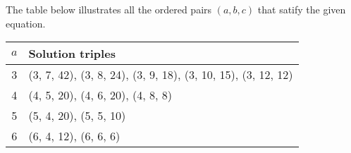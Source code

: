\begin{solution}
    The table below illustrates all the ordered pairs $(a, b, c)$ that satify
    the given equation. \qedhere
    \begin{center}
        \begin{tabular}{ |c|l| }
            \hline
            $a$ & Solution triples\\
            \hline
            3 & (3, 7, 42), (3, 8, 24), (3, 9, 18), (3, 10, 15), (3, 12, 12)\\
            4 & (4, 5, 20), (4, 6, 20), (4, 8, 8)\\
            5 & (5, 4, 20), (5, 5, 10)\\
            6 & (6, 4, 12), (6, 6, 6)\\
            \hline
        \end{tabular}
    \end{center}
\end{solution}

